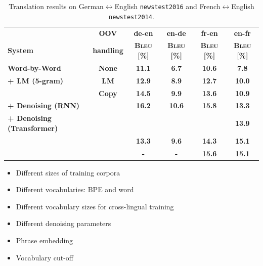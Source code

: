 \documentclass[11pt, a4paper, landscape]{article}
\begin{document}
\begin{table}
	\setcounter{table}{1}
	\caption{Translation results on German$\leftrightarrow$English \texttt{newstest2016} and French$\leftrightarrow$English \texttt{newstest2014}.}
	\centering
	\begin{tabular}{>{\bfseries}l>{\bfseries}c>{\bfseries}c>{\bfseries}c>{\bfseries}c>{\bfseries}c}
		\toprule
		& OOV & de-en & en-de & fr-en & en-fr\\
		System & handling  & \textsc{Bleu} [\%] & \textsc{Bleu} [\%] & \textsc{Bleu} [\%] & \textsc{Bleu} [\%]\\
		\midrule
		Word-by-Word & None  & 11.1 & 6.7 & 10.6 & 7.8\\
		\midrule
		+ LM (5-gram)  & LM  & 12.9 & 8.9 & 12.7 & 10.0\\
		&  Copy	& 14.5 & 9.9 & 13.6 & 10.9\\
		\midrule
		\hspace{10pt}+ Denoising (RNN) &  & 16.2 & 10.6 & 15.8 & 13.3 \\
		\hspace{10pt}+ Denoising (Transformer) & & \leavevmode\color{blue}{17.2} & \leavevmode\color{blue}{11.0} & \leavevmode\color{blue}{16.5} & \leavevmode\color{blue}13.9 \\
		\midrule
		\cite{lample2017unsupervised} & & 13.3 & 9.6 & 14.3 & 15.1\\
		\cite{artetxe2017unsupervised} & & - & - & 15.6 & 15.1\\
		\bottomrule
	\end{tabular}
	
	\label{tab:results}
\end{table}	
\vfill	
	\NewPage
	\vfill
	\begin{itemize}
		\item Different sizes of training corpora
		\item Different vocabularies: BPE and word
		\item Different vocabulary sizes for cross-lingual training
		\item Different denoising parameters
		\item Phrase embedding
		\item Vocabulary cut-off
		
	\end{itemize}
	\vfill
	\NewPage
	\vfill
\end{document}
